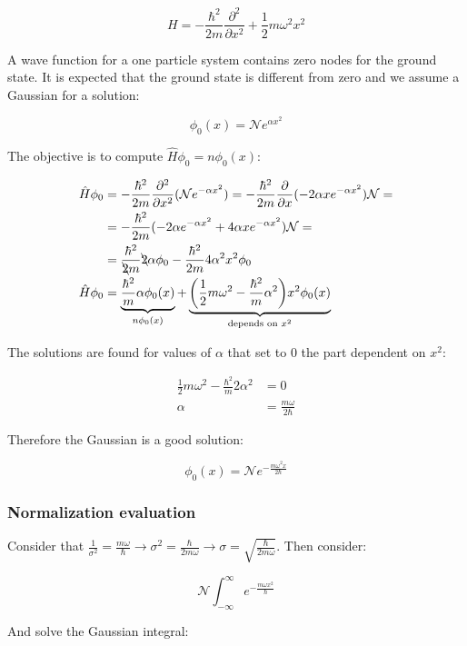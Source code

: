   $$H = -\frac{\hbar^2}{2m}\frac{\partial^2}{\partial x^2} + \frac{1}{2}m\omega^2x^2$$

  A wave function for a one particle system contains zero nodes for the ground state.
  It is expected that the ground state is different from zero and we assume a Gaussian for a solution:

  $$\phi_0(x) = \mathcal{N} e^{\alpha x^2}$$

  The objective is to compute $\hat{H}\phi_0 = n\phi_0(x)$:

  \begin{align*}
    \hat{H}\phi_0 &= -\frac{\hbar^2}{2m}\frac{\partial^2}{\partial x^2}(\mathcal{N}e^{-\alpha x^2}) = -\frac{\hbar^2}{2m}\frac{\partial}{\partial x}(-2\alpha x e^{-\alpha x^2})\mathcal{N}=\\
                  &=-\frac{\hbar^2}{2m}(-2\alpha e^{-\alpha x^2}+4\alpha xe^{-\alpha x^2})\mathcal{N}=\\
                  &= \frac{\hbar^2}{\bcancel{2}m}\bcancel{2}\alpha\phi_0 -\frac{\hbar^2}{2m}4\alpha^2 x^2\phi_0\\
    \hat{H}\phi_0 &= \underbrace{\frac{\hbar^2}{m}\alpha\phi_0(x)}_{n\phi_0(x)} + \underbrace{\biggl(\frac{1}{2}m\omega^2-\frac{\hbar^2}{m}\alpha^2\biggr)x^2\phi_0(x)}_{\text{depends on }x^2}
  \end{align*}

  The solutions are found for values of $\alpha$ that set to $0$ the part dependent on $x^2$:

  \begin{align*}
    \frac{1}{2}m\omega^2 -\frac{\hbar^2}{m}2\alpha^2 &= 0\\
    \alpha &= \frac{m\omega}{2\hbar}
  \end{align*}

  Therefore the Gaussian is a good solution:

  $$\phi_0(x) = \mathcal{N}e^{-\frac{m\omega^2x}{2\hbar}}$$

    \subsubsection{Normalization evaluation}
    Consider that $\frac{1}{\sigma^2} = \frac{m\omega}{\hbar} \rightarrow \sigma^2 = \frac{\hbar}{2m\omega}\rightarrow \sigma = \sqrt{\frac{\hbar}{2m\omega}}$.
    Then consider:

    $$\mathcal{N}\int_{-\infty}^\infty e^{-\frac{m\omega x^2}{\hbar}}$$

    And solve the Gaussian integral:

